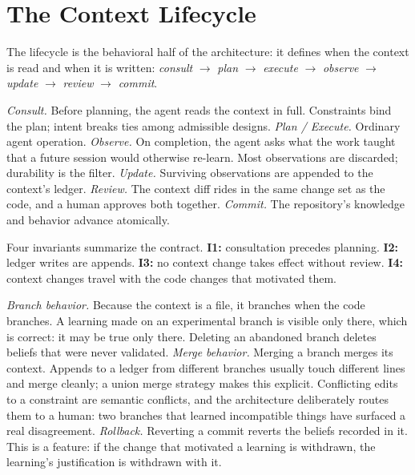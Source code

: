 \documentclass[sigconf,nonacm]{acmart}
\begin{document}
\section{The Context Lifecycle}\label{sec:lifecycle}
The lifecycle is the behavioral half of the architecture: it defines when the
context is read and when it is written: \emph{consult} $\rightarrow$ \emph{plan}
$\rightarrow$ \emph{execute} $\rightarrow$ \emph{observe} $\rightarrow$
\emph{update} $\rightarrow$ \emph{review} $\rightarrow$ \emph{commit}.

\emph{Consult.} Before planning, the agent reads the context in full. Constraints
bind the plan; intent breaks ties among admissible designs. \emph{Plan /
Execute.} Ordinary agent operation. \emph{Observe.} On completion, the agent asks
what the work taught that a future session would otherwise re-learn. Most
observations are discarded; durability is the filter. \emph{Update.} Surviving
observations are appended to the context's ledger. \emph{Review.} The context diff
rides in the same change set as the code, and a human approves both together.
\emph{Commit.} The repository's knowledge and behavior advance atomically.

Four invariants summarize the contract. \textbf{I1:} consultation precedes
planning. \textbf{I2:} ledger writes are appends. \textbf{I3:} no context change
takes effect without review. \textbf{I4:} context changes travel with the code
changes that motivated them.

\emph{Branch behavior.} Because the context is a file, it branches when the code
branches. A learning made on an experimental branch is visible only there, which
is correct: it may be true only there. Deleting an abandoned branch deletes
beliefs that were never validated. \emph{Merge behavior.} Merging a branch merges
its context. Appends to a ledger from different branches usually touch different
lines and merge cleanly; a union merge strategy makes this explicit. Conflicting
edits to a constraint are semantic conflicts, and the architecture deliberately
routes them to a human: two branches that learned incompatible things have
surfaced a real disagreement. \emph{Rollback.} Reverting a commit reverts the
beliefs recorded in it. This is a feature: if the change that motivated a learning
is withdrawn, the learning's justification is withdrawn with it.
\end{document}
